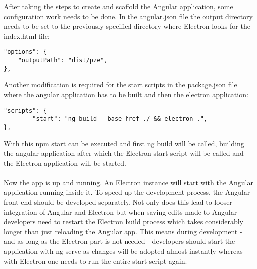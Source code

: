  
After taking the steps to create and scaffold the Angular application, some configuration work needs to be done.
In the angular.json file the output directory needs to be set to the previously specified directory where 
Electron looks for the index.html file:
\begin{lstlisting}[caption=Angular configuration for Electron]
"options": {
    "outputPath": "dist/pze",
},
\end{lstlisting}
Another modification is required for the start scripts in the package.json file where the angular application has to be built 
and then the electron application:
\begin{lstlisting}[caption=Start scripts for Electron and Angular]
"scripts": {
        "start": "ng build --base-href ./ && electron .",
},
\end{lstlisting}
With this npm start can be executed and first ng build will be called, building the angular application after which the 
Electron start script will be called and the Electron application will be started.\paragraph{}
Now the app is up and running. 
An Electron instance will start with the Angular application running inside it. 
To speed up the development process, the Angular front-end should be developed separately. 
Not only does this lead to looser integration of Angular and Electron but when saving edits made to Angular 
developers need to restart the Electron build process which takes considerably longer than just reloading 
the Angular app. 
This means during development - and as long as the Electron part is not needed - developers should start the 
application with ng serve as changes will be adopted almost instantly whereas with Electron one needs to run the 
entire start script again.\paragraph{}